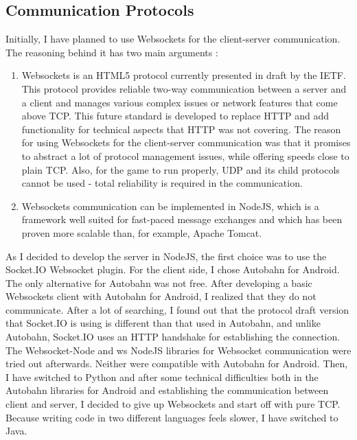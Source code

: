 \documentclass{article}
\begin{document}
\subsection{Communication Protocols}

Initially, I have planned to use Websockets for the client-server communication.
The reasoning behind it has two main arguments : 
\begin{enumerate}
  \item Websockets is an HTML5 protocol currently presented in draft by the
  IETF. This protocol provides reliable two-way communication between a server
  and a client and manages various complex issues or network features that come
  above TCP. This future standard is developed to replace HTTP and add
  functionality for technical aspects that HTTP was not covering. The reason for
  using Websockets for the client-server communication was that it promises to
  abstract a lot of protocol management issues, while offering speeds close to
  plain TCP. Also, for the game to run properly, UDP and its child protocols
  cannot be used - total reliability is required in the communication. 
  
  \item Websockets communication can be implemented in NodeJS, which is a
  framework well suited for fast-paced message exchanges and which has been
  proven more scalable than, for example, Apache Tomcat. 
\end{enumerate}

As I decided to develop the server in NodeJS, the first choice was to use the
Socket.IO Websocket plugin. For the client side, I chose Autobahn for Android.
The only alternative for Autobahn was not free. After developing a basic
Websockets client with Autobahn for Android, I realized that they do not
communicate. After a lot of searching, I found out that the protocol
draft version that Socket.IO is using is different than that used in Autobahn,
and unlike Autobahn, Socket.IO uses an HTTP handshake for establishing the
connection. The Websocket-Node and ws NodeJS libraries for Websocket
communication were tried out afterwards. Neither were compatible with Autobahn
for Android. Then, I have switched to Python and after some technical
difficulties both in the Autobahn libraries for Android and establishing the
communication between client and server, I decided to give up Websockets and
start off with pure TCP. Because writing code in two different languages feels
slower, I have switched to Java.
\end{document}
